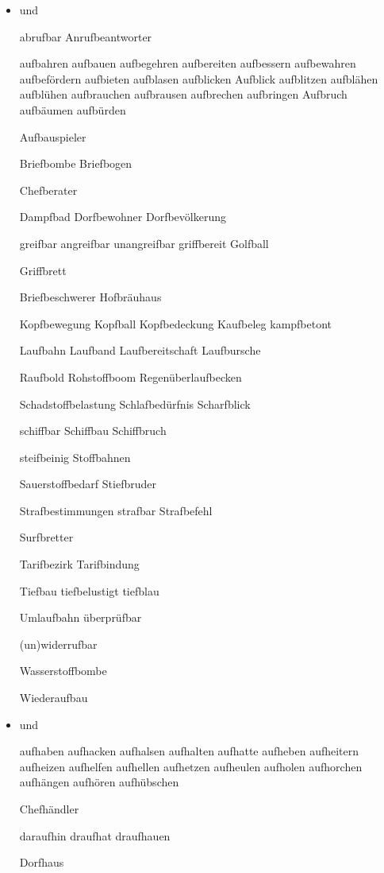 \begin{itemize}


\item {} und 


abrufbar 
Anrufbeantworter 

aufbahren aufbauen aufbegehren aufbereiten aufbessern aufbewahren aufbefördern aufbieten aufblasen aufblicken Aufblick aufblitzen aufblähen aufblühen aufbrauchen aufbrausen aufbrechen aufbringen Aufbruch aufbäumen aufbürden 

Aufbauspieler 

Briefbombe Briefbogen 

Chefberater 

Dampfbad Dorfbewohner Dorfbevölkerung

greifbar angreifbar unangreifbar griffbereit Golfball 

Griffbrett

Briefbeschwerer Hofbräuhaus 

Kopfbewegung Kopfball Kopfbedeckung Kaufbeleg kampfbetont 

Laufbahn Laufband Laufbereitschaft Laufbursche 

Raufbold Rohstoffboom Regenüberlaufbecken

Schadstoffbelastung Schlafbedürfnis Scharfblick 

schiffbar Schiffbau Schiffbruch 

steifbeinig Stoffbahnen

Sauerstoffbedarf Stiefbruder 

Strafbestimmungen strafbar Strafbefehl

Surfbretter

Tarifbezirk Tarifbindung 

Tiefbau tiefbelustigt tiefblau 

Umlaufbahn überprüfbar

(un)widerrufbar

Wasserstoffbombe

Wiederaufbau
 

\item {} und 


aufhaben aufhacken aufhalsen aufhalten aufhatte aufheben aufheitern aufheizen aufhelfen aufhellen aufhetzen aufheulen aufholen aufhorchen aufhängen aufhören aufhübschen

Chefhändler

daraufhin draufhat draufhauen 

Dorfhaus


\end{itemize}
